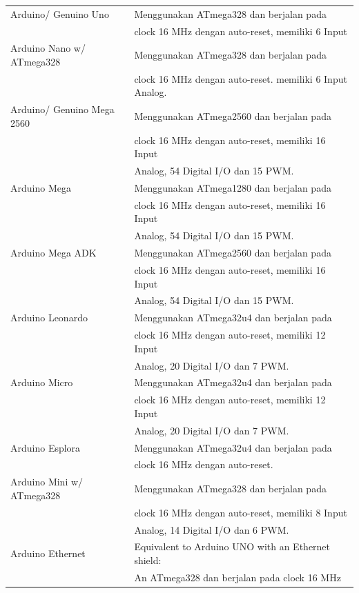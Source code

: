 \begin{table}[h!]
\centering
\begin{tabular}{ |l|l| }
\hline
Arduino/ Genuino Uno & Menggunakan ATmega328 dan berjalan pada \\
& clock 16 MHz dengan auto-reset, memiliki 6 Input \\
\hline
Arduino Nano w/ ATmega328 & Menggunakan ATmega328 dan berjalan pada \\
& clock 16 MHz dengan auto-reset. memiliki 6 Input Analog.\\
\hline
Arduino/ Genuino Mega 2560 & Menggunakan ATmega2560 dan berjalan pada \\
& clock 16 MHz dengan auto-reset, memiliki 16 Input \\
& Analog, 54 Digital I/O dan 15 PWM. \\
\hline
Arduino Mega & Menggunakan ATmega1280 dan berjalan pada \\
& clock 16 MHz dengan auto-reset, memiliki 16 Input \\
& Analog, 54 Digital I/O dan 15 PWM.\\
\hline
Arduino Mega ADK & Menggunakan ATmega2560 dan berjalan pada \\
& clock 16 MHz dengan auto-reset, memiliki 16 Input \\
& Analog, 54 Digital I/O dan 15 PWM. \\
\hline
Arduino Leonardo & Menggunakan ATmega32u4 dan berjalan pada \\
& clock 16 MHz dengan auto-reset, memiliki 12 Input \\
& Analog, 20 Digital I/O dan 7 PWM.\\
\hline
Arduino Micro & Menggunakan ATmega32u4 dan berjalan pada \\
& clock 16 MHz dengan auto-reset, memiliki 12 Input \\
& Analog, 20 Digital I/O dan 7 PWM. \\
\hline
Arduino Esplora & Menggunakan ATmega32u4 dan berjalan pada \\
& clock 16 MHz dengan auto-reset.\\
\hline
Arduino Mini w/ ATmega328 & Menggunakan ATmega328 dan berjalan pada \\
& clock 16 MHz dengan auto-reset, memiliki 8 Input \\
& Analog, 14 Digital I/O dan 6 PWM.\\
\hline
Arduino Ethernet & Equivalent to Arduino UNO with an Ethernet shield: \\
& An ATmega328 dan berjalan pada clock 16 MHz \\ 

\end{tabular}
\end{table}
